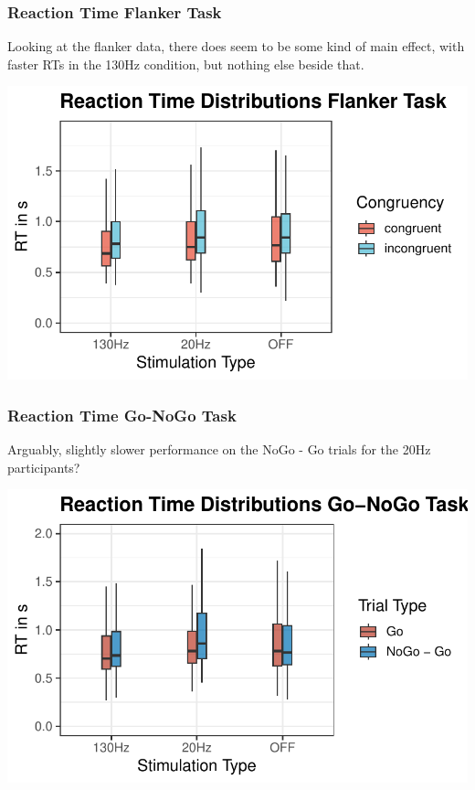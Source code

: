 \documentclass[
  letterpaper,
  DIV=11,
  numbers=noendperiod]{scrartcl}
\begin{document}
\hypertarget{reaction-time-flanker-task}{%
\subsubsection{Reaction Time Flanker
Task}\label{reaction-time-flanker-task}}

Looking at the flanker data, there does seem to be some kind of main
effect, with faster RTs in the 130Hz condition, but nothing else beside
that.

\includegraphics{MF_01_Modelfree_Analysis_files/figure-pdf/unnamed-chunk-3-1.pdf}

\hypertarget{reaction-time-go-nogo-task}{%
\subsubsection{Reaction Time Go-NoGo
Task}\label{reaction-time-go-nogo-task}}

Arguably, slightly slower performance on the NoGo - Go trials for the
20Hz participants?

\includegraphics{MF_01_Modelfree_Analysis_files/figure-pdf/unnamed-chunk-4-1.pdf}
\end{document}
